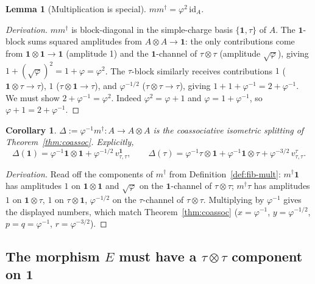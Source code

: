 \documentclass[11pt,a4paper]{article}
\newtheorem{lemma}[definition]{Lemma}
\newtheorem{corollary}[definition]{Corollary}
\theoremstyle{definition}
\newcommand{\id}{\mathrm{id}}
\newcommand{\one}{\mathbf{1}}
\begin{document}
\begin{lemma}[Multiplication is special]\label{lem:fib-special}
$mm^{\dagger} = \varphi^{2}\,\id_{A}$.
\end{lemma}

\begin{proof}[Derivation]
$mm^\dagger$ is block-diagonal in the simple-charge basis $\{\one,\tau\}$ of
$A$. The $\one$-block sums squared amplitudes from $A\otimes A\to\one$:
the only contributions come from $\one\otimes\one\to\one$ (amplitude 1) and
the $\one$-channel of $\tau\otimes\tau$ (amplitude $\sqrt\varphi$), giving
$1 + (\sqrt\varphi)^{2} = 1+\varphi = \varphi^{2}$.
The $\tau$-block similarly receives contributions $1$ ($\one\otimes\tau\to\tau$),
$1$ ($\tau\otimes\one\to\tau$), and $\varphi^{-1/2}$ ($\tau\otimes\tau\to\tau$),
giving $1+1+\varphi^{-1} = 2+\varphi^{-1}$. We must show $2+\varphi^{-1} = \varphi^{2}$.
Indeed $\varphi^{2} = \varphi + 1$ and $\varphi = 1+\varphi^{-1}$, so
$\varphi+1 = 2+\varphi^{-1}$. \checkmark
\end{proof}

\begin{corollary}\label{cor:Delta-coassoc}
$\Delta := \varphi^{-1}m^\dagger : A\to A\otimes A$ is the coassociative
isometric splitting of Theorem~\ref{thm:coassoc}. Explicitly,
\[
\Delta(\one) = \varphi^{-1}\one\otimes\one + \varphi^{-1/2}\,v^{\one}_{\tau,\tau},
\qquad
\Delta(\tau) = \varphi^{-1}\tau\otimes\one + \varphi^{-1}\one\otimes\tau
                 + \varphi^{-3/2}\,v^{\tau}_{\tau,\tau}.
\]
\end{corollary}

\begin{proof}[Derivation]
Read off the components of $m^{\dagger}$ from
Definition~\ref{def:fib-mult}: $m^\dagger\one$ has amplitudes
$1$ on $\one\otimes\one$ and $\sqrt\varphi$ on the $\one$-channel of
$\tau\otimes\tau$; $m^\dagger\tau$ has amplitudes $1$ on $\one\otimes\tau$,
$1$ on $\tau\otimes\one$, $\varphi^{-1/2}$ on the $\tau$-channel of
$\tau\otimes\tau$. Multiplying by $\varphi^{-1}$ gives the displayed numbers,
which match Theorem~\ref{thm:coassoc} ($x=\varphi^{-1}$, $y=\varphi^{-1/2}$,
$p=q=\varphi^{-1}$, $r=\varphi^{-3/2}$).
\end{proof}

\subsection{The morphism $E$ must have a $\tau\otimes\tau$ component on $\one$}\label{sec:splitting}
\end{document}

